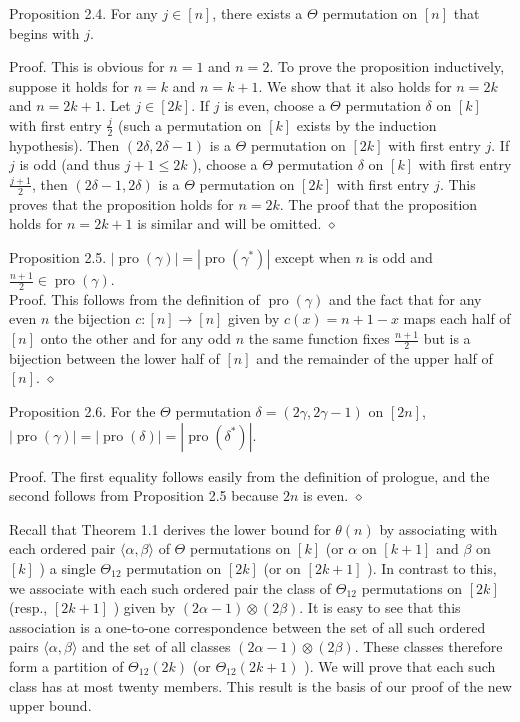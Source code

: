 \documentclass[10pt]{article}
\newcommand{\proofend}{\hfill\(\diamond\)}
\begin{document}
Proposition 2.4. For any $j \in[n]$, there exists a $\Theta$ permutation on $[n]$ that begins with $j$.

Proof. This is obvious for $n=1$ and $n=2$. To prove the proposition inductively, suppose it holds for $n=k$ and $n=k+1$. We show that it also holds for $n=2 k$ and $n=2 k+1$. Let $j \in[2 k]$. If $j$ is even, choose a $\Theta$ permutation $\delta$ on $[k]$ with first entry $\frac{j}{2}$ (such a permutation on $[k]$ exists by the induction hypothesis). Then $(2 \delta, 2 \delta-1)$ is a $\Theta$ permutation on $[2 k]$ with first entry $j$. If $j$ is odd (and thus $j+1 \leq 2 k$ ), choose a $\Theta$ permutation $\delta$ on $[k]$ with first entry $\frac{j+1}{2}$, then $(2 \delta-1,2 \delta)$ is a $\Theta$ permutation on $[2 k]$ with first entry $j$. This proves that the proposition holds for $n=2 k$. The proof that the proposition holds for $n=2 k+1$ is similar and will be omitted. \proofend

Proposition 2.5. $|\operatorname{pro}(\gamma)|=\left|\operatorname{pro}\left(\gamma^{*}\right)\right|$ except when $n$ is odd and $\frac{n+1}{2} \in \operatorname{pro}(\gamma)$.\\
Proof. This follows from the definition of $\operatorname{pro}(\gamma)$ and the fact that for any even $n$ the bijection $c:[n] \to [n]$ given by $c(x)=n+1-x$ maps each half of $[n]$ onto the other and for any odd $n$ the same function fixes $\frac{n+1}{2}$ but is a bijection between the lower half of $[n]$ and the remainder of the upper half of $[n]$. \proofend

Proposition 2.6. For the $\Theta$ permutation $\delta=(2 \gamma, 2 \gamma-1)$ on $[2n]$, $|\operatorname{pro}(\gamma)|=|\operatorname{pro}(\delta)|=\left|\operatorname{pro}\left(\delta^{*}\right)\right|$.

Proof. The first equality follows easily from the definition of prologue, and the second follows from Proposition 2.5 because $2 n$ is even. \proofend

Recall that Theorem 1.1 derives the lower bound for $\theta(n)$ by associating with each ordered pair $\langle\alpha, \beta\rangle$ of $\Theta$ permutations on $[k]$ (or $\alpha$ on $[k+1]$ and $\beta$ on $[k]$ ) a single $\Theta_{12}$ permutation on $[2 k]$ (or on $[2 k+1]$ ). In contrast to this, we associate with each such ordered pair the class of $\Theta_{12}$ permutations on $[2 k]$ (resp., $[2 k+1]$ ) given by $(2 \alpha-1) \otimes(2 \beta)$. It is easy to see that this association is a one-to-one correspondence between the set of all such ordered pairs $\langle\alpha, \beta\rangle$ and the set of all classes $(2 \alpha-1) \otimes(2 \beta)$. These classes therefore form a partition of $\Theta_{12}(2 k)$ (or $\Theta_{12}(2 k+1)$ ). We will prove that each such class has at most twenty members. This result is the basis of our proof of the new upper bound.
\end{document}
